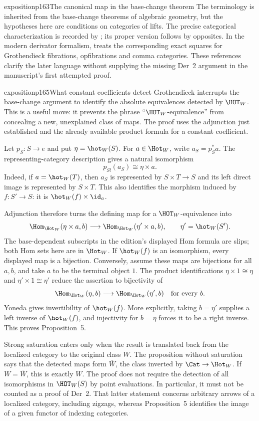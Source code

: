 \begin{dcomment}{exposition}{p163}{The canonical map in the base-change theorem}
The terminology is inherited from the base-change theorems of algebraic geometry, but the hypotheses here are conditions on categories of lifts. The precise categorical characterization is recorded by \citet[Theorem~1.2]{Maltsiniotis2005Asphericite}; its proper version follows by opposites. In the modern derivator formalism, \citet[Propositions~1.24 and~1.26]{Groth2013} treats the corresponding exact squares for Grothendieck fibrations, opfibrations and comma categories. These references clarify the later language without supplying the missing Der~2 argument in the manuscript's first attempted proof.
\end{dcomment}

\begin{dcomment}{exposition}{p165}{What constant coefficients detect}
Grothendieck interrupts the base-change argument to identify the absolute equivalences detected by $\HOT_W$. This is a useful move: it prevents the phrase ``$\HOT_W$-equivalence'' from concealing a new, unexplained class of maps. The proof uses the adjunction just established and the already available product formula for a constant coefficient.

Let $p_S:S\to e$ and put $\eta=\hot_W(S)$. For $a\in\Hot_W$, write $a_S=p_S^*a$. The representing-category description gives a natural isomorphism
\[
 p_{S!}(a_S)\cong\eta\times a.
\]
Indeed, if $a=\hot_W(T)$, then $a_S$ is represented by $S\times T\to S$ and its left direct image is represented by $S\times T$. This also identifies the morphism induced by $f:S'\to S$: it is $\hot_W(f)\times\id_a$.

Adjunction therefore turns the defining map for a $\HOT_W$-equivalence into
\[
 \Hom_{\Hot_W}(\eta\times a,b)
 \longrightarrow
 \Hom_{\Hot_W}(\eta'\times a,b),
 \qquad \eta'=\hot_W(S').
\]
The base-dependent subscripts in the edition's displayed Hom formula are slips; both Hom sets here are in $\Hot_W$. If $\hot_W(f)$ is an isomorphism, every displayed map is a bijection. Conversely, assume these maps are bijections for all $a,b$, and take $a$ to be the terminal object $1$. The product identifications $\eta\times1\cong\eta$ and $\eta'\times1\cong\eta'$ reduce the assertion to bijectivity of
\[
 \Hom_{\Hot_W}(\eta,b)\longrightarrow\Hom_{\Hot_W}(\eta',b)
 \quad\hbox{for every }b.
\]
Yoneda gives invertibility of $\hot_W(f)$. More explicitly, taking $b=\eta'$ supplies a left inverse of $\hot_W(f)$, and injectivity for $b=\eta$ forces it to be a right inverse. This proves Proposition~5.

Strong saturation enters only when the result is translated back from the localized category to the original class $W$. The proposition without saturation says that the detected maps form $\overline W$, the class inverted by $\Cat\to\Hot_W$. If $W=\overline W$, this is exactly $W$. The proof does not require the detection of all isomorphisms in $\HOT_W(S)$ by point evaluations. In particular, it must not be counted as a proof of Der~2. That latter statement concerns arbitrary arrows of a localized category, including zigzags, whereas Proposition~5 identifies the image of a given functor of indexing categories.


\end{dcomment}
